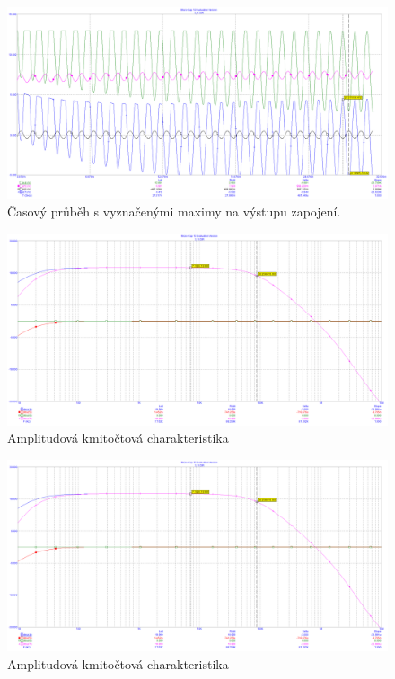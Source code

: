 \documentclass{article}
\begin{document}
\begin{figure}[H]
  \begin{minipage}[t]{\textwidth}
    \centering
    \includegraphics[width=\textwidth]{PC/ukol1/transient7.png}
    Časový průběh s vyznačenými maximy na výstupu zapojení.
  \end{minipage}
\end{figure}

\begin{figure}[H]
  \begin{minipage}[t]{\textwidth}
    \centering
    \includegraphics[width=\textwidth]{PC/ukol1/AC2.png}
    Amplitudová kmitočtová charakteristika
  \end{minipage}
\end{figure}

\begin{figure}[H]
  \begin{minipage}[t]{\textwidth}
    \centering
    \includegraphics[width=\textwidth]{PC/ukol1/AC2.png}
    Amplitudová kmitočtová charakteristika
  \end{minipage}
\end{figure}
\end{document}
